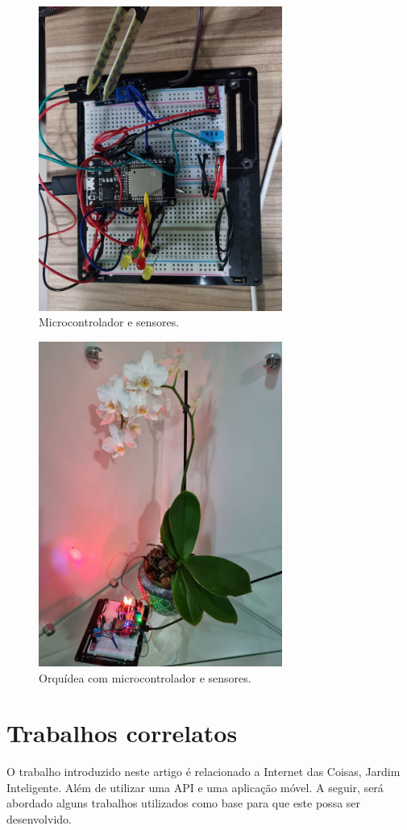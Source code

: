 \documentclass[conference]{IEEEtran}
\begin{document}
\begin{figure}
    \centering
    \includegraphics[width=8cm]{sistema_controle.jpg}
    \caption{Microcontrolador e sensores.}
    \label{fig:sistema_controle}
\end{figure}
\begin{figure}
    \centering
    \includegraphics[width=8cm]{orquidea.jpg}
    \caption{Orquídea com microcontrolador e sensores.}
    \label{fig:orquidea}
\end{figure}

\section{Trabalhos correlatos}
O trabalho introduzido neste artigo é relacionado a Internet das Coisas, Jardim Inteligente. Além de utilizar uma API e uma aplicação móvel. A seguir, será abordado alguns trabalhos utilizados como base para que este possa ser desenvolvido.
\end{document}
